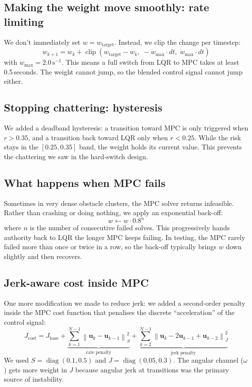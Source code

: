 \documentclass[12pt,a4paper]{article}
\newcommand{\norm}[1]{\left\lVert#1\right\rVert}
\newcommand{\diag}{\operatorname{diag}}
\begin{document}
\subsection{Making the weight move smoothly: rate limiting}

We don't immediately set $w = w_{\text{target}}$. Instead, we clip the
change per timestep:
\begin{equation}
  w_{k+1} = w_k + \operatorname{clip}(w_{\text{target}} - w_k,\;
  -\dot{w}_{\max} \cdot dt,\; \dot{w}_{\max} \cdot dt)
\end{equation}
with $\dot{w}_{\max} = 2.0\,\text{s}^{-1}$. This means a full switch from
LQR to MPC takes at least 0.5\,seconds. The weight cannot jump, so the
blended control signal cannot jump either.

\subsection{Stopping chattering: hysteresis}

We added a deadband hysteresis: a transition toward MPC is only triggered
when $r > 0.35$, and a transition back toward LQR only when $r < 0.25$.
While the risk stays in the $[0.25, 0.35]$ band, the weight holds its
current value. This prevents the chattering we saw in the hard-switch
design.

\subsection{What happens when MPC fails}

Sometimes in very dense obstacle clusters, the MPC solver returns
infeasible. Rather than crashing or doing nothing, we apply an exponential
back-off:
\begin{equation}
  w \leftarrow w \cdot 0.8^n
\end{equation}
where $n$ is the number of consecutive failed solves. This progressively
hands authority back to LQR the longer MPC keeps failing. In testing, the
MPC rarely failed more than once or twice in a row, so the back-off
typically brings $w$ down slightly and then recovers.

\subsection{Jerk-aware cost inside MPC}

One more modification we made to reduce jerk: we added a second-order
penalty inside the MPC cost function that penalises the discrete
``acceleration'' of the control signal:
\begin{equation}
  J_{\text{cost}} = J_{\text{base}} +
    \underbrace{\sum_{k=1}^{N-1} \norm{\mathbf{u}_k - \mathbf{u}_{k-1}}_S^2}
    _{\text{rate penalty}} +
    \underbrace{\sum_{k=2}^{N-1} \norm{\mathbf{u}_k - 2\mathbf{u}_{k-1}
    + \mathbf{u}_{k-2}}_J^2}_{\text{jerk penalty}}
\end{equation}
We used $S = \diag(0.1, 0.5)$ and $J = \diag(0.05, 0.3)$. The angular
channel ($\omega$) gets more weight in $J$ because angular jerk at
transitions was the primary source of instability.
\end{document}
